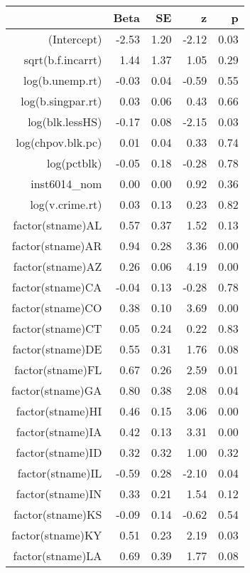 \begin{table}[ht]
\centering
\begin{tabular}{rrrrr}
  \hline
 & Beta & SE & z & p \\ 
  \hline
(Intercept) & -2.53 & 1.20 & -2.12 & 0.03 \\ 
  sqrt(b.f.incarrt) & 1.44 & 1.37 & 1.05 & 0.29 \\ 
  log(b.unemp.rt) & -0.03 & 0.04 & -0.59 & 0.55 \\ 
  log(b.singpar.rt) & 0.03 & 0.06 & 0.43 & 0.66 \\ 
  log(blk.lessHS) & -0.17 & 0.08 & -2.15 & 0.03 \\ 
  log(chpov.blk.pc) & 0.01 & 0.04 & 0.33 & 0.74 \\ 
  log(pctblk) & -0.05 & 0.18 & -0.28 & 0.78 \\ 
  inst6014\_nom & 0.00 & 0.00 & 0.92 & 0.36 \\ 
  log(v.crime.rt) & 0.03 & 0.13 & 0.23 & 0.82 \\ 
  factor(stname)AL & 0.57 & 0.37 & 1.52 & 0.13 \\ 
  factor(stname)AR & 0.94 & 0.28 & 3.36 & 0.00 \\ 
  factor(stname)AZ & 0.26 & 0.06 & 4.19 & 0.00 \\ 
  factor(stname)CA & -0.04 & 0.13 & -0.28 & 0.78 \\ 
  factor(stname)CO & 0.38 & 0.10 & 3.69 & 0.00 \\ 
  factor(stname)CT & 0.05 & 0.24 & 0.22 & 0.83 \\ 
  factor(stname)DE & 0.55 & 0.31 & 1.76 & 0.08 \\ 
  factor(stname)FL & 0.67 & 0.26 & 2.59 & 0.01 \\ 
  factor(stname)GA & 0.80 & 0.38 & 2.08 & 0.04 \\ 
  factor(stname)HI & 0.46 & 0.15 & 3.06 & 0.00 \\ 
  factor(stname)IA & 0.42 & 0.13 & 3.31 & 0.00 \\ 
  factor(stname)ID & 0.32 & 0.32 & 1.00 & 0.32 \\ 
  factor(stname)IL & -0.59 & 0.28 & -2.10 & 0.04 \\ 
  factor(stname)IN & 0.33 & 0.21 & 1.54 & 0.12 \\ 
  factor(stname)KS & -0.09 & 0.14 & -0.62 & 0.54 \\ 
  factor(stname)KY & 0.51 & 0.23 & 2.19 & 0.03 \\ 
  factor(stname)LA & 0.69 & 0.39 & 1.77 & 0.08 \\ 

\end{tabular}
\end{table}
